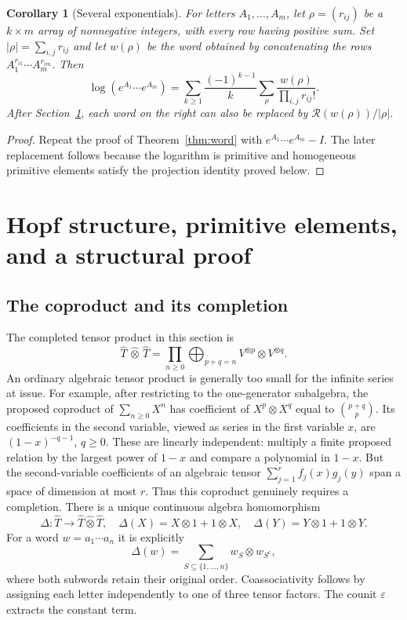 \documentclass[11pt]{article}
\newtheorem{corollary}[theorem]{Corollary}
\theoremstyle{definition}
\theoremstyle{remark}
\newcommand{\eps}{\varepsilon}
\newcommand{\Rbr}{\mathcal R}
\numberwithin{equation}{section}
\begin{document}
\begin{corollary}[Several exponentials]\label{cor:manyexp}
For letters $A_1,\ldots,A_m$, let $\rho=(r_{ij})$ be a $k\times m$ array of nonnegative integers, with every row having positive sum. Set $|\rho|=\sum_{i,j}r_{ij}$ and let $w(\rho)$ be the word obtained by concatenating the rows $A_1^{r_{i1}}\cdots A_m^{r_{im}}$. Then
\begin{equation}\label{eq:manyword}
 \log(e^{A_1}\cdots e^{A_m})
 =\sum_{k\geq1}\frac{(-1)^{k-1}}{k}
   \sum_{\rho}\frac{w(\rho)}{\prod_{i,j}r_{ij}!}.
\end{equation}
After Section~\ref{sec:hopf}, each word on the right can also be replaced by $\Rbr(w(\rho))/|\rho|$.
\end{corollary}
\begin{proof}
Repeat the proof of Theorem~\ref{thm:word} with $e^{A_1}\cdots e^{A_m}-I$. The later replacement follows because the logarithm is primitive and homogeneous primitive elements satisfy the projection identity proved below.
\end{proof}

\section{Hopf structure, primitive elements, and a structural proof}\label{sec:hopf}
\subsection{The coproduct and its completion}
The completed tensor product in this section is
\[
 \widehat T\,\widehat\otimes\,\widehat T
 =\prod_{n\geq0}\bigoplus_{p+q=n}V^{\otimes p}\otimes V^{\otimes q}.
\]
An ordinary algebraic tensor product is generally too small for the infinite series at issue. For example, after restricting to the one-generator subalgebra, the proposed coproduct of $\sum_{n\geq0}X^n$ has coefficient of $X^p\otimes X^q$ equal to $\binom{p+q}{p}$. Its coefficients in the second variable, viewed as series in the first variable $x$, are $(1-x)^{-q-1}$, $q\geq0$. These are linearly independent: multiply a finite proposed relation by the largest power of $1-x$ and compare a polynomial in $1-x$. But the second-variable coefficients of an algebraic tensor $\sum_{j=1}^r f_j(x)g_j(y)$ span a space of dimension at most $r$. Thus this coproduct genuinely requires a completion. There is a unique continuous algebra homomorphism
\begin{equation}\label{eq:coproduct}
 \Delta:\widehat T\longrightarrow\widehat T\widehat\otimes\widehat T,
 \quad \Delta(X)=X\otimes1+1\otimes X,
 \quad \Delta(Y)=Y\otimes1+1\otimes Y.
\end{equation}
For a word $w=a_1\cdots a_n$ it is explicitly
\begin{equation}\label{eq:unshuffle}
 \Delta(w)=\sum_{S\subseteq\{1,\ldots,n\}}w_S\otimes w_{S^c},
\end{equation}
where both subwords retain their original order. Coassociativity follows by assigning each letter independently to one of three tensor factors. The counit $\eps$ extracts the constant term.
\end{document}
